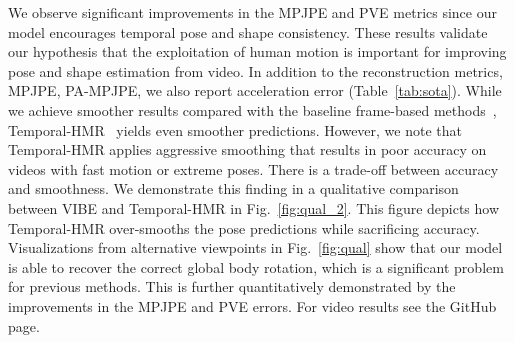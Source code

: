 \documentclass[10pt,twocolumn,letterpaper]{article}
\begin{document}
We observe  significant improvements in the MPJPE and PVE metrics since our model encourages temporal pose and shape consistency. These results validate our hypothesis that the exploitation of human motion is important for improving pose and shape estimation from video. In addition to the reconstruction metrics, \eg MPJPE, PA-MPJPE, we also report acceleration error (Table~\ref{tab:sota}).
While we achieve smoother results compared with the baseline frame-based methods~\cite{kanazawa_hmr,SPIN:ICCV:2019}, Temporal-HMR~\cite{kanazawa_temporal_hmr} yields even smoother predictions. 
However, we note that Temporal-HMR applies aggressive smoothing that results in poor accuracy on videos with fast motion or extreme poses. 
There is a trade-off between accuracy and smoothness.
We demonstrate this finding in a qualitative comparison between VIBE and Temporal-HMR in Fig.~\ref{fig:qual_2}. 
This figure depicts how Temporal-HMR over-smooths the pose predictions while sacrificing accuracy. 
Visualizations from alternative viewpoints in Fig.~\ref{fig:qual}  show that our model is able to recover the correct global body rotation, which is a significant problem for previous methods.  
This is further quantitatively demonstrated by the improvements in the MPJPE and PVE errors. For video results see the GitHub page.




\begin{table}[]
	\centering
	\caption{\textbf{Ablation experiments with motion discriminator .} We experiment with several models using HMR~\cite{kanazawa_hmr} and SPIN~\cite{SPIN:ICCV:2019} as pretrained feature extractors and add our temporal generator  along with .  provides consistent improvements over all baselines.}
	\label{tab:ablation}
\end{table}{}
\end{document}
